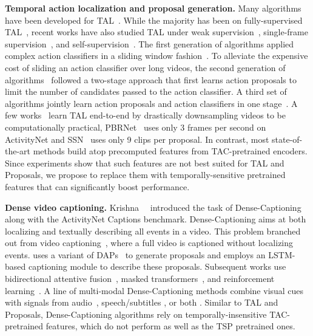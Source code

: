 \documentclass[10pt,twocolumn,letterpaper]{article}
\begin{document}
\vspace{3pt}\noindent\textbf{Temporal action localization and proposal generation.}
Many algorithms have been developed for TAL~\cite{alwassel_2018_actionsearch,dai_iccv_2017,activitynet_challenge,shou_cvpr_2017,yeung_cvpr_2016}. While the majority has been on fully-supervised TAL~\cite{TSA_Net,li2020deep,dbg,liu2020progressive,long2019gaussian}, recent works have also studied TAL under weak supervision~\cite{basnet_aaai20,liu2019weakly,pardo2021refineloc,paul_eccv_2018,shou_eccv_2018}, single-frame supervision~\cite{ma2020sfnet}, and self-supervision~\cite{Jain_2020_CVPR}. The first generation of algorithms applied complex action classifiers in a sliding window fashion~\cite{gaidon_ijcv_2013, oneata_cvpr_2014}. To alleviate the expensive cost of sliding an action classifier over long videos, the second generation of algorithms~\cite{buch_cvpr_2017, gao_iccv_2017,Lin_2019_ICCV,lin_eccv_2018,shou_cvpr_2016,Zeng_2019_ICCV} followed a two-stage approach that first learns action proposals to limit the number of candidates passed to the action classifier. A third set of algorithms jointly learn action proposals and action classifiers in one stage~\cite{chao_cvpr_2018,xu_iccv_2017,xu2020gtad,zhao_iccv_2017}. A few works~\cite{liu2020progressive,zhao_iccv_2017} learn TAL end-to-end by drastically downsampling videos to be computationally practical, \eg PBRNet~\cite{liu2020progressive} uses only 3 frames per second on ActivityNet and SSN~\cite{zhao_iccv_2017} uses only 9 clips per proposal. In contrast, most state-of-the-art methods build atop precomputed features from TAC-pretrained encoders. Since experiments show that such features are not best suited for TAL and Proposals, we propose to replace them with temporally-sensitive pretrained features that can significantly boost performance.

\vspace{3pt}\noindent\textbf{Dense video captioning.}
Krishna~\etal~\cite{activitynet_captions_dataset} introduced the task of Dense-Captioning along with the ActivityNet Captions benchmark. Dense-Captioning aims at both localizing and textually describing all events in a video. This problem branched out from video captioning~\cite{wang2018video,yan2019stat,pei2019memory}, where a full video is captioned without localizing events. \cite{activitynet_captions_dataset} uses a variant of DAPs~\cite{escorcia2016daps} to generate proposals and employs an LSTM-based captioning module to describe these proposals. Subsequent works use bidirectional attentive fusion~\cite{Wang_2018_CVPR}, masked transformers~\cite{Zhou_2018_CVPR}, and reinforcement  learning~\cite{Li_dvc,sdvc,mft}. A line of multi-modal Dense-Captioning methods combine visual cues with signals from audio~\cite{rahman2019watch}, speech/subtitles \cite{shi2019dense}, or both \cite{bmt,mdvc}. Similar to TAL and Proposals, Dense-Captioning algorithms rely on temporally-insensitive TAC-pretrained features, which do not perform as well as the TSP pretrained ones. 
\end{document}
